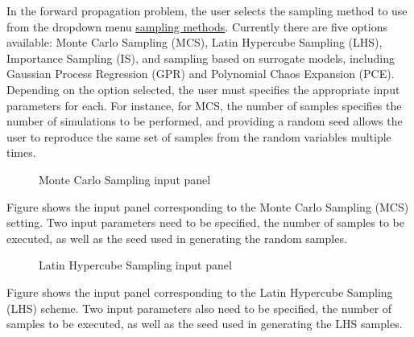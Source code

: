 In the forward propagation problem, the user selects the sampling 
method to use from the dropdown menu \href{https://dakota.sandia.gov//sites/default/files/docs/6.9/html-ref/method-sampling.html}{sampling methods}. Currently there are five options available: 
Monte Carlo Sampling (MCS),  Latin Hypercube Sampling (LHS), Importance Sampling (IS), and sampling based on surrogate models, including Gaussian Process Regression (GPR) and Polynomial Chaos Expansion (PCE). Depending on the option selected, the user must specifies the appropriate input parameters for each. For instance, for MCS, the number of samples specifies the number of simulations to be performed, and providing a random seed allows the user to reproduce the same set of samples from the random variables multiple times.

\begin{figure}[!htbp]
  \caption{Monte Carlo Sampling input panel}
  \label{fig:mcs}
\end{figure}

Figure  shows the input panel corresponding to the Monte Carlo Sampling (MCS) setting. Two input parameters need to be specified, the number of samples to be executed, as well as the seed used in generating the random samples. 


\begin{figure}[!htbp]
  \caption{Latin Hypercube Sampling input panel}
  \label{fig:lhs}
\end{figure}

Figure  shows the input panel corresponding to the Latin Hypercube Sampling (LHS) scheme. Two input parameters also need to be specified, the number of samples to be executed, as well as the seed used in generating the LHS samples. 

